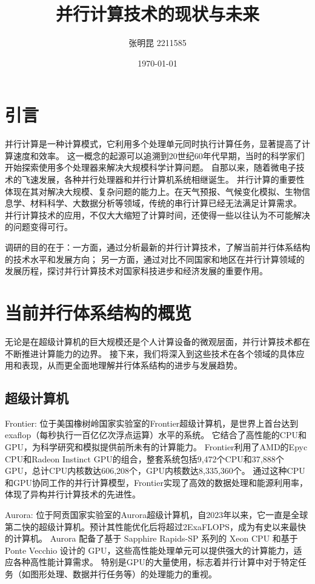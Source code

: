 \documentclass{ctexart}
\title{并行计算技术的现状与未来}
\author{张明昆 2211585}
\date{\today}
\begin{document}
\maketitle
\tableofcontents
\section{引言}
并行计算是一种计算模式，它利用多个处理单元同时执行计算任务，显著提高了计算速度和效率。
这一概念的起源可以追溯到20世纪60年代早期，当时的科学家们开始探索使用多个处理器来解决大规模科学计算问题。
自那以来，随着微电子技术的飞速发展，各种并行处理器和并行计算机系统相继诞生。
并行计算的重要性体现在其对解决大规模、复杂问题的能力上。在天气预报、气候变化模拟、生物信息学、材料科学、大数据分析等领域，传统的串行计算已经无法满足计算需求。
并行计算技术的应用，不仅大大缩短了计算时间，还使得一些以往认为不可能解决的问题变得可行。

调研的目的在于：一方面，通过分析最新的并行计算技术，了解当前并行体系结构的技术水平和发展方向；
另一方面，通过对比不同国家和地区在并行计算领域的发展历程，探讨并行计算技术对国家科技进步和经济发展的重要作用。
\section{当前并行体系结构的概览}
无论是在超级计算机的巨大规模还是个人计算设备的微观层面，并行计算技术都在不断推进计算能力的边界。
接下来，我们将深入到这些技术在各个领域的具体应用和表现，从而更全面地理解并行体系结构的进步与发展趋势。
\subsection{超级计算机}
Frontier: 位于美国橡树岭国家实验室的Frontier超级计算机，是世界上首台达到exaflop（每秒执行一百亿亿次浮点运算）水平的系统。
它结合了高性能的CPU和GPU，为科学研究和模拟提供前所未有的计算能力。
Frontier利用了AMD的Epyc CPU和Radeon Instinct GPU的组合，整套系统包括9,472个CPU和37,888个GPU，总计CPU内核数达606,208个，GPU内核数达8,335,360个。 \cite{choi2022beating}
通过这种CPU和GPU协同工作的并行计算模型，Frontier实现了高效的数据处理和能源利用率，体现了异构并行计算技术的先进性。

Aurora: 位于阿贡国家实验室的Aurora超级计算机，自2023年以来，它一直是全球第二快的超级计算机。预计其性能优化后将超过2ExaFLOPS，成为有史以来最快的计算机。\cite{intel2023datacenter}
Aurora 配备了基于 Sapphire Rapids-SP 系列的 Xeon CPU 和基于 Ponte Vecchio 设计的 GPU，这些高性能处理单元可以提供强大的计算能力，适应各种高性能计算需求。
特别是GPU的大量使用，标志着并行计算中对于特定任务（如图形处理、数据并行任务等）的处理能力的重视。
\end{document}
